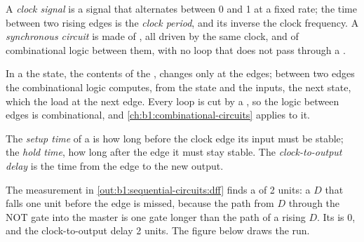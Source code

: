 \label{out:b1:sequential-circuits:dff}

\begin{definition}\label{def:b1:sequential-circuits:clock}
A \emph{clock signal} is a signal that alternates between 0 and 1 at a fixed rate; the time between
two rising edges is the \emph{clock period}, and its inverse the clock frequency. A
\emph{synchronous circuit} is made of , all driven by the same clock, and of
combinational logic between them, with no loop that does not pass through a .
\end{definition}

In a  the state, the contents of the , changes only at the edges; between two edges the
combinational logic computes, from the state and the inputs, the next state, which the  load at the next edge.
Every loop is cut by a , so the logic between edges is combinational, and \cref{ch:b1:combinational-circuits}
applies to it.

\begin{definition}\label{def:b1:sequential-circuits:setup}
The \emph{setup time} of a  is how long before the clock edge its input must be stable; the
\emph{hold time}, how long after the edge it must stay stable. The \emph{clock-to-output delay} is the
time from the edge to the new output.
\end{definition}

The measurement in \cref{out:b1:sequential-circuits:dff} finds a  of 2 units: a $D$ that falls one unit before
the edge is missed, because the path from $D$ through the NOT gate into the master is one gate longer than the path of a
rising $D$. Its  is 0, and the clock-to-output delay 2 units. The figure below draws the run.


